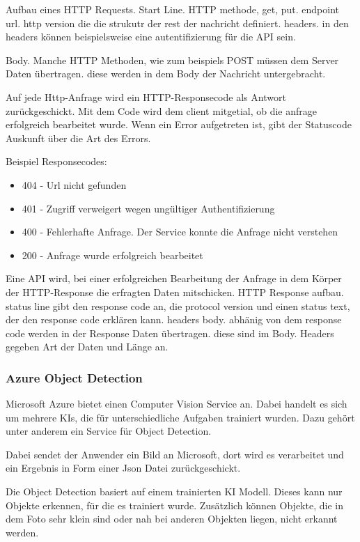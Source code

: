 Aufbau eines HTTP Requests. Start Line. HTTP methode, get, put. endpoint url. http version die die strukutr der rest der nachricht definiert.
headers. in den headers können beispielsweise eine autentifizierung für die API sein.

Body. Manche HTTP Methoden, wie zum beispiels POST müssen dem Server Daten übertragen. diese werden in dem Body der Nachricht untergebracht.
  
Auf jede Http-Anfrage wird ein HTTP-Responsecode als Antwort zurückgeschickt. Mit dem Code wird dem client mitgetial, ob die anfrage erfolgreich bearbeitet wurde. Wenn ein Error aufgetreten ist, gibt der Statuscode Auskunft über die Art des Errors. 

Beispiel Responsecodes:
\begin{itemize}
	\item 404 - Url nicht gefunden
	\item 401 - Zugriff verweigert wegen ungültiger Authentifizierung
	\item 400 - Fehlerhafte Anfrage. Der Service konnte die Anfrage nicht verstehen
	\item 200 - Anfrage wurde erfolgreich bearbeitet
\end{itemize}

Eine API wird, bei einer erfolgreichen Bearbeitung der Anfrage in dem Körper der HTTP-Response die erfragten Daten mitschicken.
HTTP Response aufbau.
status line gibt den response code an, die protocol version und einen status text, der den response code erklären kann.
headers
body. abhänig von dem response code werden in der Response Daten übertragen. diese sind im Body.
Headers gegeben Art der Daten und Länge an.


\subsubsection{Azure Object Detection}
Microsoft Azure bietet einen Computer Vision Service an. Dabei handelt es sich um mehrere KIs, die für unterschiedliche Aufgaben trainiert wurden. Dazu gehört unter anderem ein Service für Object Detection.

Dabei sendet der Anwender ein Bild an Microsoft, dort wird es verarbeitet und ein Ergebnis in Form einer Json Datei zurückgeschickt.\citep{getAzure,whatIsAzure,objDetectAzure,Azure302Doc}

Die Object Detection basiert auf einem trainierten KI Modell. Dieses kann nur Objekte erkennen, für die es trainiert wurde.
Zusätzlich können Objekte, die in dem Foto sehr klein sind oder nah bei anderen Objekten liegen, nicht erkannt werden.\citep{azureobjdetec}

